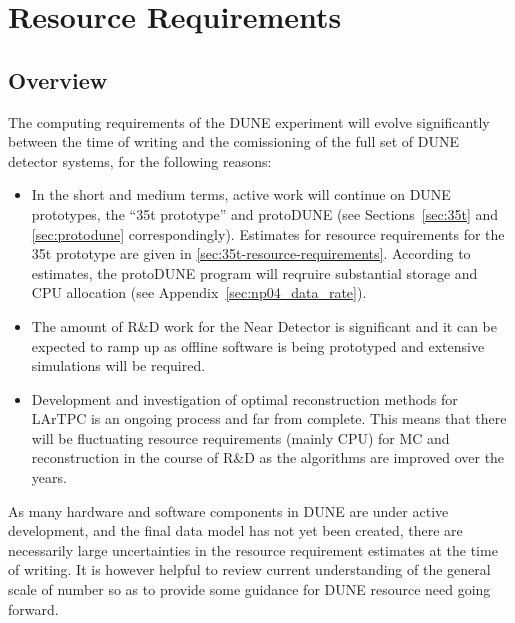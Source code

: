 \section{Resource Requirements}
\label{sec:resource-requirements}
\subsection{Overview}
The computing requirements of the DUNE experiment will evolve significantly between the time of writing
and the comissioning of the full set of DUNE detector systems, for the following reasons:
\begin{itemize}
\item In the short and medium terms, active work will continue on DUNE prototypes, the ``35t prototype'' and protoDUNE
(see Sections~\ref{sec:35t} and \ref{sec:protodune} correspondingly). Estimates for resource requirements for the 35t
prototype are given in \ref{sec:35t-resource-requirements}. According to estimates, the protoDUNE program
will reqruire substantial storage and CPU allocation (see Appendix~\ref{sec:np04_data_rate}).

\item The amount of R\&D work for the Near Detector is significant and it can be expected to ramp up as offline software
is being prototyped and extensive simulations will be required.

\item Development and investigation of optimal reconstruction methods for LArTPC is an ongoing process and far from complete.
This means that there will be fluctuating resource requirements (mainly CPU) for MC and reconstruction in the course of R\&D
as the algorithms are improved over the years.

\end{itemize}

\noindent
As many hardware and software components in DUNE are under active development,
and the final data model has not yet been created, there are necessarily large uncertainties in the resource requirement estimates
at the time of writing. It is however helpful to review current understanding of the general scale of number so as to provide some
guidance for DUNE resource need going forward.




